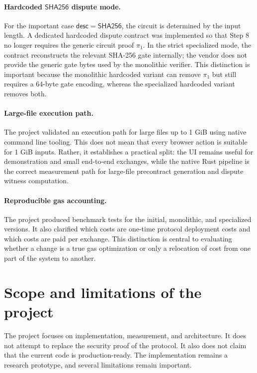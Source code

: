 \paragraph{Hardcoded \(\mathsf{SHA256}\) dispute mode.}
For the important case \(\mathsf{desc}=\mathsf{SHA256}\), the circuit is determined by the
input length. A dedicated hardcoded dispute contract was implemented so that Step 8 no
longer requires the generic circuit proof \(\pi_1\). In the strict specialized mode, the
contract reconstructs the relevant SHA-256 gate internally; the vendor does not provide the
generic gate bytes used by the monolithic verifier. This distinction is important because the
monolithic hardcoded variant can remove \(\pi_1\) but still requires a 64-byte gate encoding,
whereas the specialized hardcoded variant removes both.

\paragraph{Large-file execution path.}
The project validated an execution path for large files up to 1 GiB using native command
line tooling. This does not mean that every browser action is suitable for 1 GiB inputs.
Rather, it establishes a practical split: the UI remains useful for demonstration and small
end-to-end exchanges, while the native Rust pipeline is the correct measurement path for
large-file precontract generation and dispute witness computation.

\paragraph{Reproducible gas accounting.}
The project produced benchmark tests for the initial, monolithic, and specialized versions.
It also clarified which costs are one-time protocol deployment costs and which costs are
paid per exchange. This distinction is central to evaluating whether a change is a true gas
optimization or only a relocation of cost from one part of the system to another.

\section{Scope and limitations of the project}

The project focuses on implementation, measurement, and architecture. It does not attempt to
replace the security proof of the \sox{} protocol. It also does not claim that the current
code is production-ready. The implementation remains a research prototype, and several
limitations remain important.

